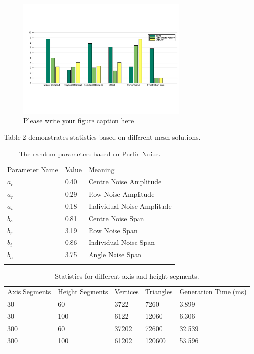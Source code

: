 \begin{figure}
  \includegraphics[width=0.75\textwidth]{f7.pdf}
\caption{Please write your figure caption here}
\label{fig:1}       %
\end{figure}

Table 2 demonstrates statistics based on different mesh solutions. 

\begin{table}
\caption{The random parameters based on Perlin Noise.}
\label{tab:1}       %
\begin{tabular}{lll}
\hline\noalign{\smallskip}
Parameter Name & Value & Meaning  \\
\noalign{\smallskip}\hline\noalign{\smallskip}
$a_{c}$ & 0.40 & Centre Noise Amplitude \\
$a_{r}$ & 0.29 & Row Noise Amplitude \\
$a_{i}$ & 0.18 & Individual Noise Amplitude \\
$b_{c}$ & 0.81 & Centre Noise Span \\
$b_{r}$ & 3.19 & Row Noise Span \\
$b_{i}$ & 0.86 & Individual Noise Span \\
$b_{a}$ & 3.75 & Angle Noise Span \\
\noalign{\smallskip}\hline
\end{tabular}
\end{table}


\begin{table}
\caption{Statistics for different axis and height segments.}
\label{tab:1}       %
\begin{tabular}{lllll}
\hline\noalign{\smallskip}
Axis Segments & Height Segments & Vertices & Triangles & Generation Time (ms)\\
\noalign{\smallskip}\hline\noalign{\smallskip}
30 & 60 & 3722 & 7260 & 3.899 \\
30 & 100 & 6122 & 12060 & 6.306 \\
300 & 60 & 37202 & 72600 & 32.539 \\
300 & 100 & 61202 & 120600 & 53.596 \\
\noalign{\smallskip}\hline
\end{tabular}
\end{table}

